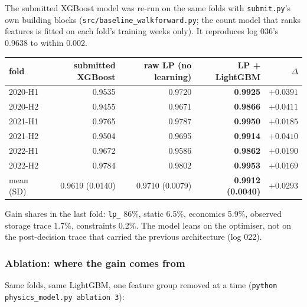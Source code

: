 The submitted XGBoost model was re-run on the same folds with \texttt{submit.py}'s own building
blocks (\texttt{src/baseline\_walkforward.py}; the count model that ranks features is fitted on each
fold's training weeks only). It reproduces log 036's 0.9638 to within 0.002.

\begin{center}\small
\begin{tabular}{lrrrr}
\toprule
fold & submitted XGBoost & raw LP (no learning) & LP + LightGBM & $\Delta$ \\
\midrule
2020-H1 & 0.9535 & 0.9720 & \textbf{0.9925} & $+0.0391$ \\
2020-H2 & 0.9455 & 0.9671 & \textbf{0.9866} & $+0.0411$ \\
2021-H1 & 0.9765 & 0.9787 & \textbf{0.9950} & $+0.0185$ \\
2021-H2 & 0.9504 & 0.9695 & \textbf{0.9914} & $+0.0410$ \\
2022-H1 & 0.9672 & 0.9586 & \textbf{0.9862} & $+0.0190$ \\
2022-H2 & 0.9784 & 0.9802 & \textbf{0.9953} & $+0.0169$ \\
\midrule
mean (SD) & 0.9619 (0.0140) & 0.9710 (0.0079) & \textbf{0.9912 (0.0040)} & $+0.0293$ \\
\bottomrule
\end{tabular}
\end{center}


Gain shares in the last fold: \texttt{lp\_} 86\%, static 6.5\%, economics 5.9\%, observed storage
trace 1.7\%, constraints 0.2\%. The model leans on the optimiser, not on the post-decision trace
that carried the previous architecture (log 022).

\subsubsection*{Ablation: where the gain comes from}

Same folds, same LightGBM, one feature group removed at a time
(\texttt{python physics\_model.py ablation 3}):

